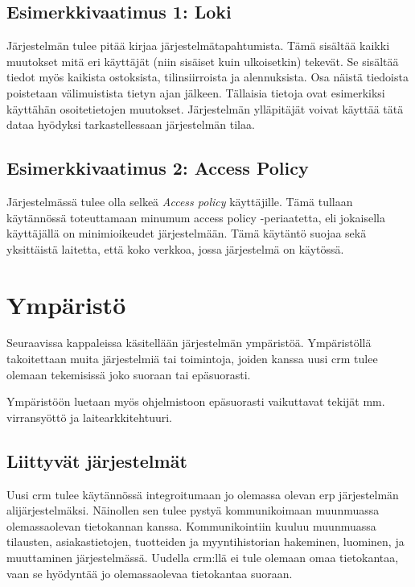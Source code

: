     \subsection{Esimerkkivaatimus 1: Loki}
        Järjestelmän tulee pitää kirjaa järjestelmätapahtumista. Tämä sisältää kaikki muutokset mitä eri käyttäjät (niin sisäiset kuin ulkoisetkin) tekevät.
        Se sisältää tiedot myös kaikista ostoksista, tilinsiirroista ja alennuksista. Osa näistä tiedoista poistetaan välimuistista tietyn ajan 
        jälkeen. Tällaisia tietoja ovat esimerkiksi käyttähän osoitetietojen muutokset. Järjestelmän ylläpitäjät voivat käyttää tätä dataa hyödyksi tarkastellessaan 
        järjestelmän tilaa. 
    \subsection{Esimerkkivaatimus 2: Access Policy}
        Järjestelmässä tulee olla selkeä \textit{Access policy} käyttäjille. Tämä tullaan käytännössä toteuttamaan
        minumum access policy -periaatetta, eli jokaisella käyttäjällä on minimioikeudet järjestelmään.
        Tämä käytäntö suojaa sekä yksittäistä laitetta, että koko verkkoa, jossa järjestelmä on käytössä. 

\section{Ympäristö}     %

    Seuraavissa kappaleissa käsitellään järjestelmän ympäristöä. Ympäristöllä takoitettaan muita järjestelmiä tai toimintoja, joiden kanssa uusi \gls{crm} tulee olemaan tekemisissä joko suoraan tai epäsuorasti.
    
    Ympäristöön luetaan myös ohjelmistoon epäsuorasti vaikuttavat tekijät mm. virransyöttö ja laitearkkitehtuuri.

    \subsection{Liittyvät järjestelmät}     %
        Uusi \gls{crm} tulee käytännössä integroitumaan jo olemassa olevan \gls{erp} järjestelmän alijärjestelmäksi. Näinollen sen tulee pystyä kommunikoimaan
         muunmuassa olemassaolevan tietokannan kanssa. Kommunikointiin kuuluu muunmuassa tilausten, asiakastietojen, tuotteiden ja myyntihistorian hakeminen, 
         luominen, ja muuttaminen järjestelmässä. Uudella \gls{crm}:llä ei tule olemaan omaa tietokantaa, vaan se hyödyntää jo olemassaolevaa tietokantaa suoraan. 

